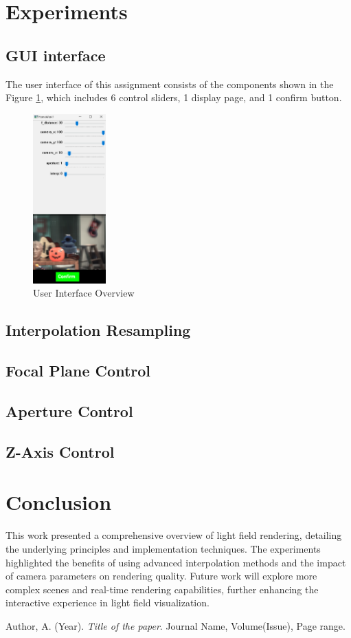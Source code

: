 \documentclass{article}
\begin{document}
\section{Experiments}
\subsection{GUI interface}
The user interface of this assignment consists of the components shown in the Figure \ref{fig:ui}, which includes 6 control sliders, 1 display page, and 1 confirm button.

\begin{figure}[h]
    \centering
    \includegraphics[width=0.25\textwidth]{GUI.png} %
    \caption{User Interface Overview}
    \label{fig:ui}
\end{figure}

\subsection{Interpolation Resampling}


\subsection{Focal Plane Control}

\subsection{Aperture Control}

\subsection{Z-Axis Control}


\section{Conclusion}
This work presented a comprehensive overview of light field rendering, detailing the underlying principles and implementation techniques. The experiments highlighted the benefits of using advanced interpolation methods and the impact of camera parameters on rendering quality. Future work will explore more complex scenes and real-time rendering capabilities, further enhancing the interactive experience in light field visualization.

\begin{thebibliography}{9}
    Author, A. (Year). 
    \textit{Title of the paper}. Journal Name, Volume(Issue), Page range.
    
\end{thebibliography}
\end{document}

